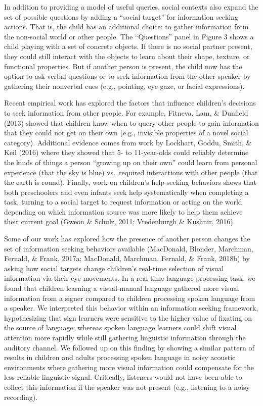 \documentclass[oneside]{report}
\begin{document}
In addition to providing a model of useful queries, social contexts also
expand the set of possible questions by adding a ``social target'' for
information seeking actions. That is, the child has an additional
choice: to gather information from the non-social world or other people.
The ``Questions'' panel in Figure 3 shows a child playing with a set of
concrete objects. If there is no social partner present, they could
still interact with the objects to learn about their shape, texture, or
functional properties. But if another person is present, the child now
has the option to ask verbal questions or to seek information from the
other speaker by gathering their nonverbal cues (e.g., pointing, eye
gaze, or facial expressions).

Recent empirical work has explored the factors that influence children's
decisions to seek information from other people. For example, Fitneva,
Lam, \& Dunfield (2013) showed that children know when to query other
people to gain information that they could not get on their own (e.g.,
invisible properties of a novel social category). Additional evidence
comes from work by Lockhart, Goddu, Smith, \& Keil (2016) where they
showed that 5- to 11-year-olds could reliably determine the kinds of
things a person ``growing up on their own'' could learn from personal
experience (that the sky is blue) vs.~required interactions with other
people (that the earth is round). Finally, work on children's
help-seeking behaviors shows that both preschoolers and even infants
seek help systematically when completing a task, turning to a social
target to request information or acting on the world depending on which
information source was more likely to help them achieve their current
goal (Gweon \& Schulz, 2011; Vredenburgh \& Kushnir, 2016).

Some of our work has explored how the presence of another person changes
the set of information seeking behaviors available (MacDonald, Blonder,
Marchman, Fernald, \& Frank, 2017a; MacDonald, Marchman, Fernald, \&
Frank, 2018b) by asking how social targets change children's real-time
selection of visual information via their eye movements. In a real-time
language processing task, we found that children learning a
visual-manual language gathered more visual information from a signer
compared to children processing spoken language from a speaker. We
interpreted this behavior within an information seeking framework,
hypothesizing that sign learners were sensitive to the higher value of
fixating on the source of language; whereas spoken language learners
could shift visual attention more rapidly while still gathering
linguistic information through the auditory channel. We followed up on
this finding by showing a similar pattern of results in children and
adults processing spoken language in noisy acoustic environments where
gathering more visual information could compensate for the less reliable
linguistic signal. Critically, listeners would not have been able to
collect this information if the speaker was not present (e.g., listening
to a noisy recording).
\end{document}
